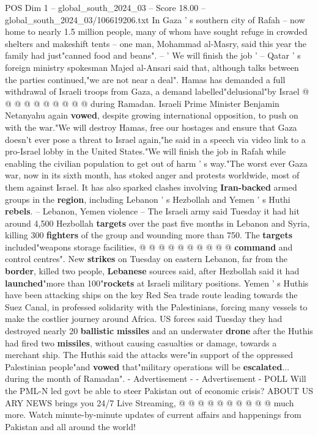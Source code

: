\begin{textsample}{POS Dim 1 – global\_south\_2024\_03 – Score 18.00 – global\_south\_2024\_03/106619206.txt}
In Gaza ' s southern city of Rafah -- now home to nearly 1.5 million people, many of whom have sought refuge in crowded shelters and makeshift tents -- one man, Mohammad al-Masry, said this year the family had just"canned food and beans". -- ' We will finish the job ' -- Qatar ' s foreign ministry spokesman Majed al-Ansari said that, although talks between the parties continued,"we are not near a deal".
Hamas has demanded a full withdrawal of Israeli troops from Gaza, a demand labelled"delusional"by Israel @ @ @ @ @ @ @ @ @ @ during Ramadan.
Israeli Prime Minister Benjamin Netanyahu again \textbf{vowed}, despite growing international opposition, to push on with the war."We will destroy Hamas, free our hostages and ensure that Gaza doesn't ever pose a threat to Israel again,"he said in a speech via video link to a pro-Israel lobby in the United States."We will finish the job in Rafah while enabling the civilian population to get out of harm ' s way."The worst ever Gaza war, now in its sixth month, has stoked anger and protests worldwide, most of them against Israel.
It has also sparked clashes involving \textbf{Iran-backed} armed groups in the \textbf{region}, including Lebanon ' s Hezbollah and Yemen ' s Huthi \textbf{rebels}. -- Lebanon, Yemen violence -- The Israeli army said Tuesday it had hit around 4,500 Hezbollah \textbf{targets} over the past five months in Lebanon and Syria, killing 300 \textbf{fighters} of the group and wounding more than 750.
The \textbf{targets} included"weapons storage facilities, @ @ @ @ @ @ @ @ @ @ \textbf{command} and control centres".
New \textbf{strikes} on Tuesday on eastern Lebanon, far from the \textbf{border}, killed two people, \textbf{Lebanese} sources said, after Hezbollah said it had \textbf{launched}"more than 100"\textbf{rockets} at Israeli military positions.
Yemen ' s Huthis have been attacking ships on the key Red Sea trade route leading towards the Suez Canal, in professed solidarity with the Palestinians, forcing many vessels to make the costlier journey around Africa.
US forces said Tuesday they had destroyed nearly 20 \textbf{ballistic} \textbf{missiles} and an underwater \textbf{drone} after the Huthis had fired two \textbf{missiles}, without causing casualties or damage, towards a merchant ship.
The Huthis said the attacks were"in support of the oppressed Palestinian people"and \textbf{vowed} that"military operations will be \textbf{escalated}... during the month of Ramadan". - Advertisement - - Advertisement - POLL Will the PML-N led govt be able to steer Pakistan out of economic crisis?
ABOUT US ARY NEWS brings you 24/7 Live Streaming, @ @ @ @ @ @ @ @ @ @ much more.
Watch minute-by-minute updates of current affairs and happenings from Pakistan and all around the world!

\end{textsample}
